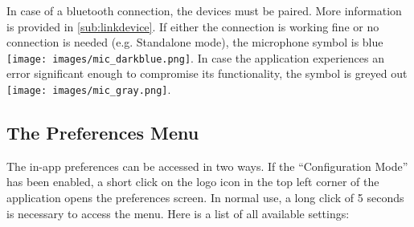 \documentclass[11pt,a4paper,titlepage]{article}
\begin{document}
In case of a bluetooth connection, the devices must be paired. More information is provided in \ref{sub:linkdevice}. If either the connection is working fine or no connection is needed (e.g. Standalone mode), the microphone symbol is blue \texttt{[image: images/mic\_darkblue.png]}. In case the application experiences an error significant enough to compromise its functionality, the symbol is greyed out \texttt{[image: images/mic\_gray.png]}.




\subsection{The Preferences Menu}\label{sub:preferences}

The in-app preferences can be accessed in two ways. If the ``Configuration Mode'' has been enabled, a short click on the logo icon in the top left corner of the application opens the preferences screen. In normal use, a long click of 5 seconds is necessary to access the menu. Here is a list of all available settings:
\end{document}
